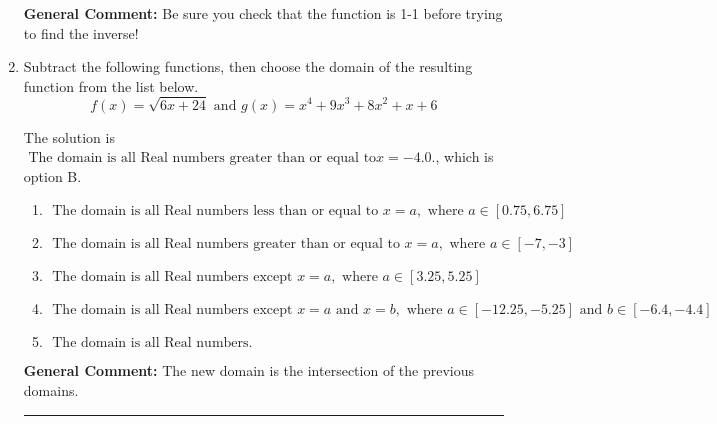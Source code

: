 \documentclass{extbook}[14pt]
\newcommand{\litem}[1]{\item #1

\rule{\textwidth}{0.4pt}}
\begin{document}
\begin{enumerate}
{\textbf{General Comment:} Be sure you check that the function is 1-1 before trying to find the inverse!
}
\litem{
Subtract the following functions, then choose the domain of the resulting function from the list below.
\[ f(x) = \sqrt{6x+24}  \text{ and } g(x) = x^{4} +9 x^{3} +8 x^{2} +x + 6 \]

The solution is \( \text{ The domain is all Real numbers greater than or equal to} x = -4.0. \), which is option B.\begin{enumerate}[label=\Alph*.]
\item \( \text{ The domain is all Real numbers less than or equal to } x = a, \text{ where } a \in [0.75, 6.75] \)


\item \( \text{ The domain is all Real numbers greater than or equal to } x = a, \text{ where } a \in [-7, -3] \)


\item \( \text{ The domain is all Real numbers except } x = a, \text{ where } a \in [3.25, 5.25] \)


\item \( \text{ The domain is all Real numbers except } x = a \text{ and } x = b, \text{ where } a \in [-12.25, -5.25] \text{ and } b \in [-6.4, -4.4] \)


\item \( \text{ The domain is all Real numbers. } \)


\end{enumerate}

\textbf{General Comment:} The new domain is the intersection of the previous domains.
}
\end{enumerate}
\end{document}
